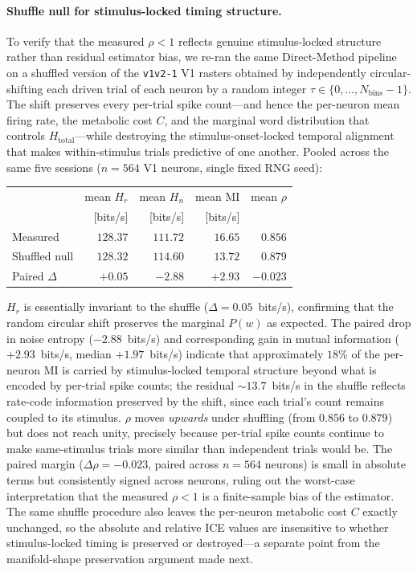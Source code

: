 \documentclass[11pt]{article}
\theoremstyle{remark}
\theoremstyle{definition}
\begin{document}
\paragraph{Shuffle null for stimulus-locked timing structure.}
To verify that the measured $\rho<1$ reflects genuine stimulus-locked structure rather than residual estimator bias, we re-ran the same Direct-Method pipeline on a shuffled version of the \texttt{v1v2-1} V1 rasters obtained by independently circular-shifting each driven trial of each neuron by a random integer $\tau\in\{0,\ldots,N_{\mathrm{bins}}-1\}$.  The shift preserves every per-trial spike count---and hence the per-neuron mean firing rate, the metabolic cost $C$, and the marginal word distribution that controls $H_{\mathrm{total}}$---while destroying the stimulus-onset-locked temporal alignment that makes within-stimulus trials predictive of one another.  Pooled across the same five sessions ($n=564$ V1 neurons, single fixed RNG seed):
\begin{center}
\begin{tabular}{lrrrr}
\toprule
& mean $H_r$ & mean $H_n$ & mean $\mathrm{MI}$ & mean $\rho$ \\
& [bits/s] & [bits/s] & [bits/s] & \\
\midrule
Measured        & $128.37$ & $111.72$ & $16.65$ & $0.856$ \\
Shuffled null   & $128.32$ & $114.60$ & $13.72$ & $0.879$ \\
Paired $\Delta$ & $+0.05$ & $-2.88$ & $+2.93$ & $-0.023$ \\
\bottomrule
\end{tabular}
\end{center}
$H_r$ is essentially invariant to the shuffle ($\Delta = 0.05$~bits/s), confirming that the random circular shift preserves the marginal $P(w)$ as expected.  The paired drop in noise entropy ($-2.88$~bits/s) and corresponding gain in mutual information ($+2.93$~bits/s, median $+1.97$~bits/s) indicate that approximately $18\%$ of the per-neuron MI is carried by stimulus-locked temporal structure beyond what is encoded by per-trial spike counts; the residual $\sim 13.7$~bits/s in the shuffle reflects rate-code information preserved by the shift, since each trial's count remains coupled to its stimulus.  $\rho$ moves \emph{upwards} under shuffling (from $0.856$ to $0.879$) but does not reach unity, precisely because per-trial spike counts continue to make same-stimulus trials more similar than independent trials would be.  The paired margin ($\Delta\rho = -0.023$, paired across $n=564$ neurons) is small in absolute terms but consistently signed across neurons, ruling out the worst-case interpretation that the measured $\rho<1$ is a finite-sample bias of the estimator.  The same shuffle procedure also leaves the per-neuron metabolic cost $C$ exactly unchanged, so the absolute and relative ICE values are insensitive to whether stimulus-locked timing is preserved or destroyed---a separate point from the manifold-shape preservation argument made next.
\end{document}
